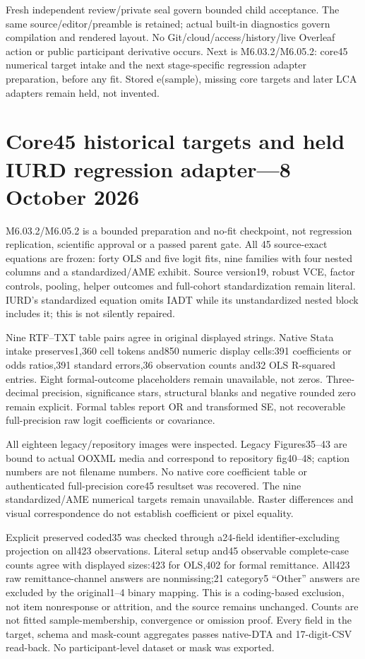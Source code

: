 \documentclass[11pt,a4paper]{article}
\begin{document}
Fresh independent review/private seal govern bounded child acceptance.
The same source/editor/preamble is retained; actual built-in diagnostics
govern compilation and rendered layout. No Git/cloud/access/history/live
Overleaf action or public participant derivative occurs. Next is
M6.03.2/M6.05.2: core45 numerical target intake and the next stage-specific
regression adapter preparation, before any fit. Stored e(sample), missing
core targets and later LCA adapters remain held, not invented.
\section{Core45 historical targets and held IURD regression adapter---8 October 2026}

M6.03.2/M6.05.2 is a bounded preparation and no-fit checkpoint, not
regression replication, scientific approval or a passed parent gate. All
45 source-exact equations are frozen: forty OLS and five logit fits, nine
families with four nested columns and a standardized/AME exhibit. Source
version19, robust VCE, factor controls, pooling, helper outcomes and full-cohort
standardization remain literal. IURD's standardized equation omits IADT while
its unstandardized nested block includes it; this is not silently repaired.

Nine RTF--TXT table pairs agree in original displayed strings. Native Stata
intake preserves1,360 cell tokens and850 numeric display cells:391 coefficients
or odds ratios,391 standard errors,36 observation counts and32 OLS R-squared
entries. Eight formal-outcome placeholders remain unavailable, not zeros.
Three-decimal precision, significance stars, structural blanks and negative
rounded zero remain explicit. Formal tables report OR and transformed SE,
not recoverable full-precision raw logit coefficients or covariance.

All eighteen legacy/repository images were inspected. Legacy Figures35--43
are bound to actual OOXML media and correspond to repository fig40--48;
caption numbers are not filename numbers. No native core coefficient table
or authenticated full-precision core45 resultset was recovered. The nine
standardized/AME numerical targets remain unavailable. Raster differences
and visual correspondence do not establish coefficient or pixel equality.

Explicit preserved coded35 was checked through a24-field identifier-excluding
projection on all423 observations. Literal setup and45 observable complete-case
counts agree with displayed sizes:423 for OLS,402 for formal remittance.
All423 raw remittance-channel answers are nonmissing;21 category5 ``Other''
answers are excluded by the original1--4 binary mapping. This is a coding-based
exclusion, not item nonresponse or attrition, and the source remains unchanged.
Counts are not fitted sample-membership, convergence or omission proof. Every
field in the target, schema and mask-count aggregates passes native-DTA and
17-digit-CSV read-back. No participant-level dataset or mask was exported.
\end{document}
